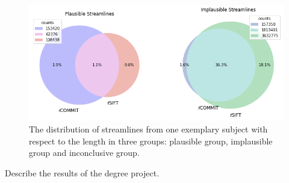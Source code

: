 \begin{figure}[ht]
    \centering
    \includegraphics[width= 12cm]{figures/comp_s_c.png}
        \caption{The distribution of streamlines from one exemplary subject with respect to the length in three groups: plausible group, implausible group and inconclusive group. }
    \label{fig:com_s_c}
\end{figure}


Describe the results of the degree project.

